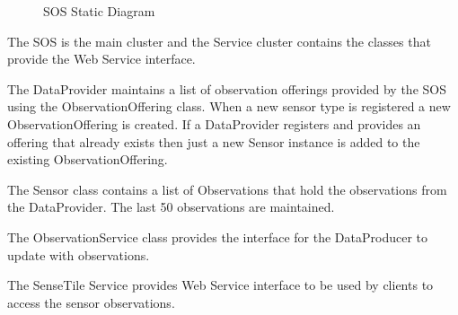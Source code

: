 \documentclass[]{final_report}
\begin{document}
 \begin{figure}[h!]
\caption{SOS Static Diagram}\label{fig:bon_static_diagam_provider.png}
\end{figure}
The SOS is the main cluster and the Service cluster contains the classes that provide the Web Service interface.

The DataProvider maintains a list of observation offerings provided by the SOS using the ObservationOffering class. When a new sensor type is registered a new ObservationOffering is created. If a DataProvider registers and provides an offering that already exists then just a new Sensor instance is added to the existing ObservationOffering.
 
The Sensor class contains a list of Observations that hold the observations from the DataProvider. The last 50 observations are maintained.

The ObservationService class provides the interface for the DataProducer to update with observations.

The SenseTile Service provides Web Service interface to be used by clients to access the sensor observations.
\end{document}
